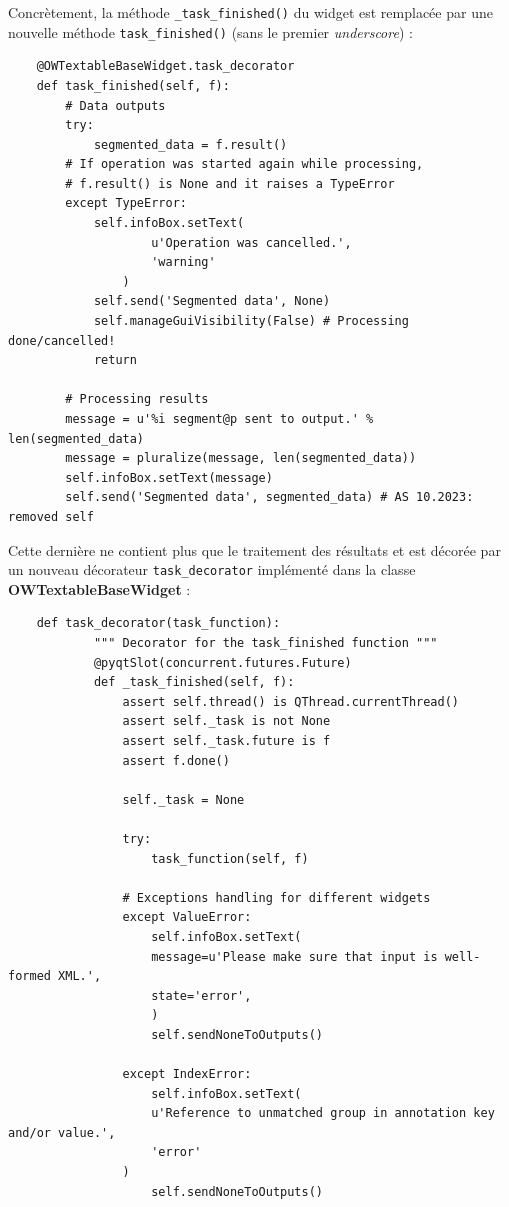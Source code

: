 \documentclass{article}
\begin{document}
{Concrètement, la méthode \texttt{\_task\_finished()} du widget est remplacée par une nouvelle méthode \texttt{task\_finished()} (sans le premier \textit{underscore}) : 

\begin{verbatim}
    @OWTextableBaseWidget.task_decorator
    def task_finished(self, f):
        # Data outputs
        try:
            segmented_data = f.result()
        # If operation was started again while processing,
        # f.result() is None and it raises a TypeError
        except TypeError:
            self.infoBox.setText(
                    u'Operation was cancelled.',
                    'warning'
                )
            self.send('Segmented data', None)
            self.manageGuiVisibility(False) # Processing done/cancelled!
            return

        # Processing results
        message = u'%i segment@p sent to output.' % len(segmented_data)
        message = pluralize(message, len(segmented_data))
        self.infoBox.setText(message)
        self.send('Segmented data', segmented_data) # AS 10.2023: removed self
\end{verbatim}

Cette dernière ne contient plus que le traitement des résultats et est décorée par un nouveau décorateur \texttt{task\_decorator} implémenté dans la classe \textbf{OWTextableBaseWidget} : 

\begin{verbatim}
    def task_decorator(task_function):
            """ Decorator for the task_finished function """
            @pyqtSlot(concurrent.futures.Future)
            def _task_finished(self, f):
                assert self.thread() is QThread.currentThread()
                assert self._task is not None
                assert self._task.future is f
                assert f.done()

                self._task = None
                
                try:
                    task_function(self, f)
                
                # Exceptions handling for different widgets
                except ValueError:
                    self.infoBox.setText(
                    message=u'Please make sure that input is well-formed XML.',
                    state='error',
                    )
                    self.sendNoneToOutputs()
                    
                except IndexError:
                    self.infoBox.setText(
                    u'Reference to unmatched group in annotation key and/or value.',
                    'error'
                )
                    self.sendNoneToOutputs()


\end{verbatim}}
\end{document}
